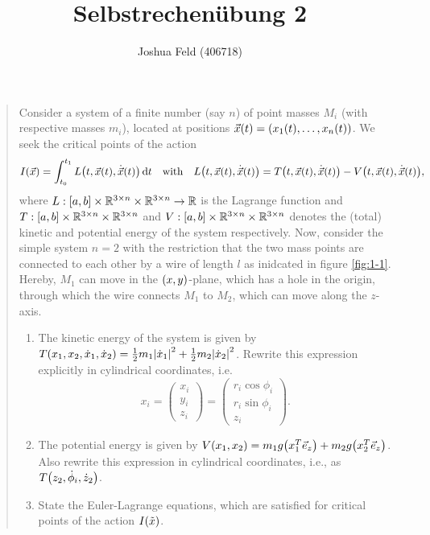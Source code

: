 \documentclass{exercise}
\title{Selbstrechenübung 2}
\author{Joshua Feld (406718)}
\begin{document}
	\maketitle


	\section{}

	\begin{quote}
		Consider a system of a finite number (say \(n\)) of point masses \(M_i\) (with respective masses \(m_i\)), located at positions \(\vec{x}\parentheses*{t} = \parentheses*{x_1\parentheses*{t}, \ldots, x_n\parentheses*{t}}\).
		We seek the critical points of the action
		\[
			I\parentheses*{\vec{x}} = \int_{t_0}^{t_1}L\parentheses*{t, \vec{x}\parentheses*{t}, \dot{\vec{x}}\parentheses*{t}}\d t \quad \text{with} \quad L\parentheses*{t, \vec{x}\parentheses*{t}, \dot{\vec{x}}\parentheses*{t}} = T\parentheses*{t, \vec{x}\parentheses*{t}, \dot{\vec{x}}\parentheses*{t}} - V\parentheses*{t, \vec{x}\parentheses*{t}, \dot{\vec{x}}\parentheses*{t}},
		\]
		where \(L: \brackets*{a, b} \times \R^{3 \times n} \times \R^{3 \times n} \to \R\) is the Lagrange function and \(T: \brackets*{a, b} \times \R^{3 \times n} \times \R^{3 \times n}\) and \(V: \brackets*{a, b} \times \R^{3 \times n} \times \R^{3 \times n}\) denotes the (total) kinetic and potential energy of the system respectively.
		Now, consider the simple system \(n = 2\) with the restriction that the two mass points are connected to each other by a wire of length \(l\) as inidcated in figure \ref{fig:1-1}.
		Hereby, \(M_1\) can move in the \(\parentheses*{x, y}\)-plane, which has a hole in the origin, through which the wire connects \(M_1\) to \(M_2\), which can move along the \(z\)-axis.
		\begin{enumerate}
			\item The kinetic energy of the system is given by \(T\parentheses*{x_1, x_2, \dot{x}_1, \dot{x}_2} = \frac{1}{2}m_1 \absolute*{\dot{x}_1}^2 + \frac{1}{2}m_2 \absolute*{\dot{x}_2}^2\).
			Rewrite this expression explicitly in cylindrical coordinates, i.e.
			\[
				x_i = \begin{pmatrix}
					x_i\\
					y_i\\
					z_i
				\end{pmatrix} = \begin{pmatrix}
					r_i \cos\phi_i\\
					r_i \sin\phi_i\\
					z_i
				\end{pmatrix}.
			\]
			\item The potential energy is given by \(V\parentheses*{x_1, x_2} = m_1 g\parentheses*{x_1^T \vec{e}_z} + m_2 g\parentheses*{x_2^T \vec{e}_z}\).
			Also rewrite this expression in cylindrical coordinates, i.e., as \(T\parentheses*{z_2, \dot{\phi}_i, \dot{z}_2}\).
			\item State the Euler-Lagrange equations, which are satisfied for critical points of the action \(I\parentheses*{\tilde{x}}\).
		\end{enumerate}
	\end{quote}
\end{document}
